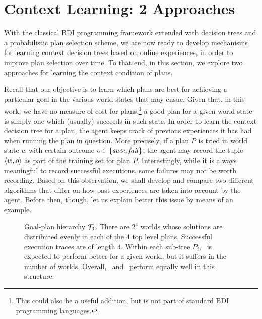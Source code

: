 \section{Context Learning: 2 Approaches}\label{sec:context_learning}

\newcommand{\success}{\mbox{\emph{succ}}}
\newcommand{\failure}{\mbox{\emph{fail}}}

With the classical BDI programming framework extended with decision trees and a
probabilistic plan selection scheme, we are now ready to develop mechanisms for
learning context decision trees
based on online experiences, in order to improve plan selection over time.
To that end, in this section, we explore two approaches for learning the context
condition of plans.



Recall that our objective is to learn which plans are best for achieving
a particular goal in the various world states that may ensue. Given that,
in this work, we have no measure of cost for plans,\footnote{This could also be a
useful addition, but is not part of standard BDI programming languages.} a good
plan for a given world state is simply one which (usually) succeeds in such
state. In order to learn the context decision tree for a plan, the agent keeps
track of previous experiences it has had when running the plan in question. More
precisely, if a plan $P$ is tried in world state $w$ with certain outcome $o \in
\{\success,\failure\}$, the agent may record the tuple $\langle w,o \rangle$ as part of
the training set for plan $P$.
Interestingly, while it is always meaningful to record successful executions,
some failures may not be worth recording. Based on this observation, we shall
develop and compare two different algorithms that differ on how past experiences
are taken into account by the agent. Before then, though, let us explain better
this issue by means of an example.
 

\begin{figure}[t]
\begin{center}

\end{center}
\caption{Goal-plan hierarchy ${\mathcal{T}}_3$. There are $2^4$ worlds whose solutions are
distributed evenly in each of the $4$ top level plans. Successful execution
traces are of length $4$. Within each sub-tree $P_i$, \BUL\ is expected to
perform better for a given world, but it suffers in the number of worlds. Overall, \CL\ and \BUL\
perform equally well in this structure.}
\label{fig:T3}
\end{figure}



